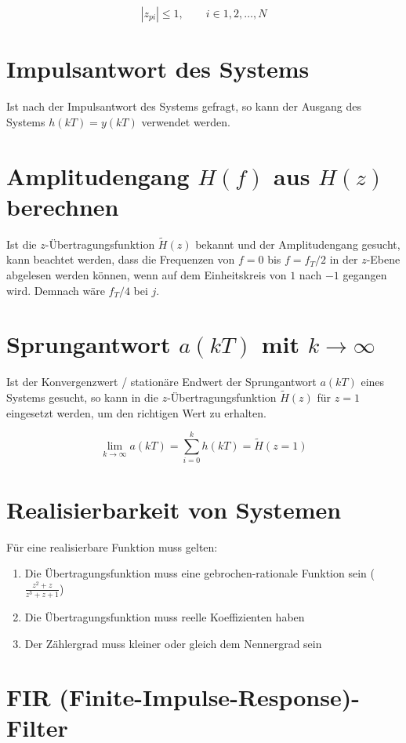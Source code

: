 \documentclass[twoside,10pt,a5paper]{scrartcl}
\begin{document}
\[|z_{pi}| \leq 1, \qquad i \in 1, 2, \ldots , N\]

\section{Impulsantwort des Systems}

Ist nach der Impulsantwort des Systems gefragt, so kann der Ausgang des Systems \(h(kT) = y(kT)\) verwendet werden.

\section{Amplitudengang $H(f)$ aus $H(z)$ berechnen}

Ist die \(z\)-Übertragungsfunktion \(\tilde{H}(z)\) bekannt und der Amplitudengang gesucht, kann beachtet werden, dass die Frequenzen von \(f = 0\) bis \(f = f_T/2\) in der \(z\)-Ebene abgelesen werden können, wenn auf dem Einheitskreis von \(1\) nach \(-1\) gegangen wird. Demnach wäre \(f_T/4\) bei \(j\).

\section{Sprungantwort $a(kT)$ mit $k \rightarrow \infty$}

Ist der Konvergenzwert / stationäre Endwert der Sprungantwort \(a(kT)\) eines Systems gesucht, so kann in die \(z\)-Übertragungsfunktion \(\tilde{H}(z)\) für \(z = 1\) eingesetzt werden, um den richtigen Wert zu erhalten.

\[\lim_{k \rightarrow \infty}a(kT) = \sum_{i=0}^k h(kT) = \tilde{H}(z = 1)\]

\section{Realisierbarkeit von Systemen}

Für eine realisierbare Funktion muss gelten:

\begin{enumerate}
\item Die Übertragungsfunktion muss eine gebrochen-rationale Funktion sein (\(\frac{z^2+z}{z^3+z+1}\))
\item Die Übertragungsfunktion muss reelle Koeffizienten haben
\item Der Zählergrad muss kleiner oder gleich dem Nennergrad sein
\end{enumerate}

\section{FIR (Finite-Impulse-Response)-Filter}
\end{document}
